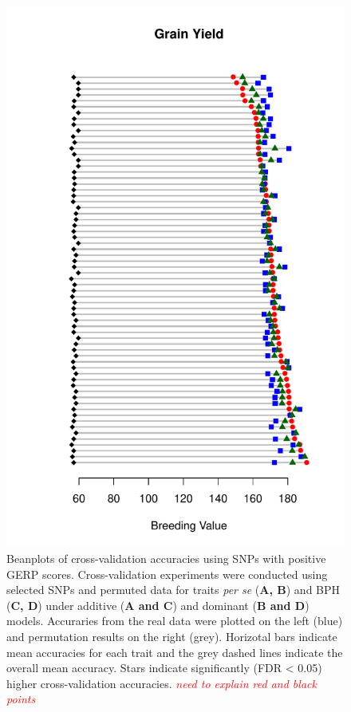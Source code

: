 \documentclass[twoside,twocolumn, letterpaper]{article}
\newcommand{\jri}[1]{\textcolor{red}{ \emph{ #1}} }
\begin{document}
\begin{figure}[htbp]
\centering
\includegraphics[width=\linewidth]{Fig5_triploid.pdf}
\caption{Beanplots of cross-validation accuracies using SNPs with positive GERP scores. Cross-validation experiments were conducted using selected SNPs and permuted data for traits \emph{per se} (\textbf{A, B}) and BPH (\textbf{C, D}) under additive (\textbf{A and C}) and dominant (\textbf{B and D}) models. Accuraries from the real data were plotted on the left (blue) and permutation results on the right (grey). Horizotal bars indicate mean accuracies for each trait and the grey dashed lines indicate the overall mean accuracy. Stars indicate significantly (FDR < 0.05) higher cross-validation accuracies.  \jri{need to explain red and black points}}
\label{fig:gerpall}
\end{figure}
\end{document}
